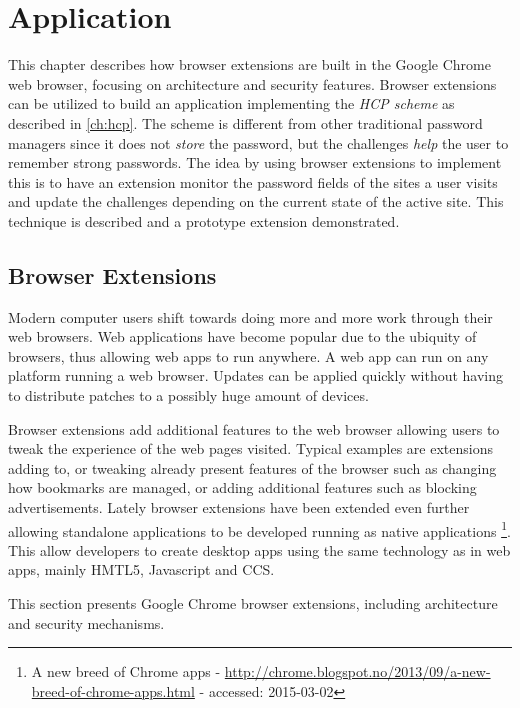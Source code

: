 \chapter{Application}\label{app}
This chapter describes how browser extensions are built in the Google Chrome web browser, focusing on architecture and security features. Browser extensions can be utilized to build an application implementing the \emph{HCP scheme} as described in \autoref{ch:hcp}. The scheme is different from other traditional password managers since it does not \emph{store} the password, but the challenges \emph{help} the user to remember strong passwords. The idea by using browser extensions to implement this is to have an extension monitor the password fields of the sites a user visits and update the challenges depending on the current state of the active site. This technique is described and a prototype extension demonstrated. 
\section{Browser Extensions}\label{browser-extensions}
Modern computer users shift towards doing more and more work through their web browsers. Web applications have become popular due to the ubiquity of browsers, thus allowing web apps to run anywhere. A web app can run on any platform running a web browser. Updates can be applied quickly without having to distribute patches to a possibly huge amount of devices.
\par Browser extensions add additional features to the web browser allowing users to tweak the experience of the web pages visited. Typical examples are extensions adding to, or tweaking already present features of the browser such as changing how bookmarks are managed, or adding additional features such as blocking advertisements. Lately browser extensions have been extended even further allowing standalone applications to be developed running as native applications \footnote{A new breed of Chrome apps - \url{http://chrome.blogspot.no/2013/09/a-new-breed-of-chrome-apps.html} - accessed: 2015-03-02}. This allow developers to create desktop apps using the same technology as in web apps, mainly HMTL5, Javascript and CCS.
\par This section presents Google Chrome browser extensions, including architecture and security mechanisms.


